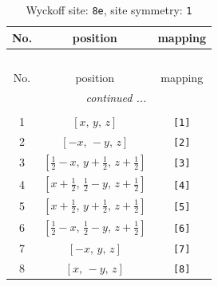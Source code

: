 \documentclass[fleqn,8pt]{jsarticle}
\begin{document}
\renewcommand{\arraystretch}{1.2}
\begin{longtable}{ccc}
\caption{Wyckoff site: {\tt 8e}, site symmetry: {\tt 1}}
 \\
 \hline \hline
No. & position & mapping \\ \hline \endfirsthead

\multicolumn{2}{l}{\tablename\ \thetable{}} \\
 \hline \hline
No. & position & mapping \\ \hline \endhead

 \hline \hline
\multicolumn{2}{r}{\footnotesize\it continued ...} \\ \endfoot

 \hline \hline
\multicolumn{2}{r}{} \\ \endlastfoot

1 & $\left[ x,\, y,\, z \right]$ & {\tt [1]} \\ \hline
2 & $\left[ - x,\, - y,\, z \right]$ & {\tt [2]} \\ \hline
3 & $\left[ \frac{1}{2} - x,\, y + \frac{1}{2},\, z + \frac{1}{2} \right]$ & {\tt [3]} \\ \hline
4 & $\left[ x + \frac{1}{2},\, \frac{1}{2} - y,\, z + \frac{1}{2} \right]$ & {\tt [4]} \\ \hline
5 & $\left[ x + \frac{1}{2},\, y + \frac{1}{2},\, z + \frac{1}{2} \right]$ & {\tt [5]} \\ \hline
6 & $\left[ \frac{1}{2} - x,\, \frac{1}{2} - y,\, z + \frac{1}{2} \right]$ & {\tt [6]} \\ \hline
7 & $\left[ - x,\, y,\, z \right]$ & {\tt [7]} \\ \hline
8 & $\left[ x,\, - y,\, z \right]$ & {\tt [8]} \\
\end{longtable}
\end{document}

